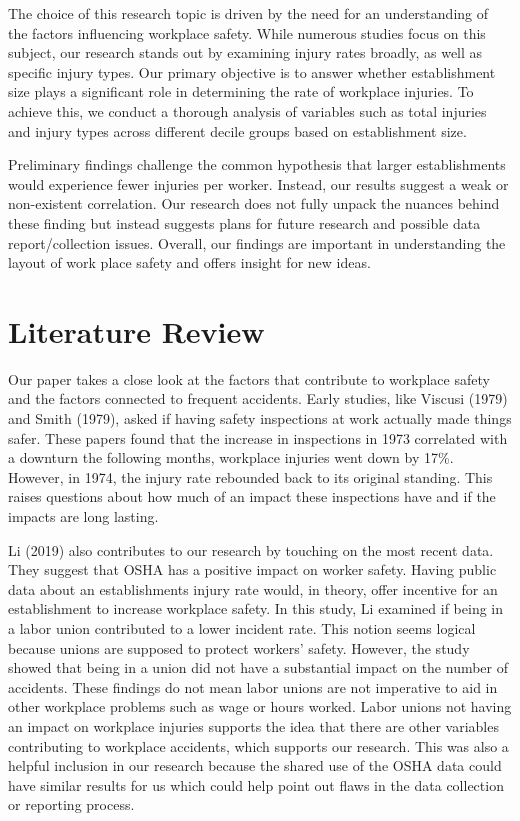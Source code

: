 \documentclass[12pt]{article}
\begin{document}
The choice of this research topic is driven by the need for an understanding of the factors influencing workplace safety. While numerous studies focus on this subject, our research stands out by examining injury rates broadly, as well as specific injury types. Our primary objective is to answer whether establishment size plays a significant role in determining the rate of workplace injuries. To achieve this, we conduct a thorough analysis of variables such as total injuries and injury types across different decile groups based on establishment size.

Preliminary findings challenge the common hypothesis that larger establishments would experience fewer injuries per worker. Instead, our results suggest a weak or non-existent correlation. Our research does not fully unpack the nuances behind these finding but instead suggests plans for future research and possible data report/collection issues. Overall, our findings are important in understanding the layout of work place safety and offers insight for new ideas. 

\section{Literature Review} \label{sec:literature}

Our paper takes a close look at the factors that contribute to workplace safety and the factors connected to frequent accidents. Early studies, like Viscusi (1979) and Smith (1979), asked if having safety inspections at work actually made things safer. These papers found that the increase in inspections in 1973 correlated with a downturn the following months, workplace injuries went down by 17\%. However, in 1974, the injury rate rebounded back to its original standing. This raises questions about how much of an impact these inspections have and if the impacts are long lasting. 

Li (2019) also contributes to our research by touching on the most recent data. They suggest that OSHA has a positive impact on worker safety. Having public data about an establishments injury rate would, in theory, offer incentive for an establishment to increase workplace safety. In this study, Li examined if being in a labor union contributed to a lower incident rate. This notion seems logical because unions are supposed to protect workers' safety. However, the study showed that being in a union did not have a substantial impact on the number of accidents. These findings do not mean labor unions are not imperative to aid in other workplace problems such as wage or hours worked. Labor unions not having an impact on workplace injuries supports the idea that there are other variables contributing to workplace accidents, which supports our research. This was also a helpful inclusion in our research because the shared use of the OSHA data could have similar results for us which could help point out flaws in the data collection or reporting process. 
\end{document}

